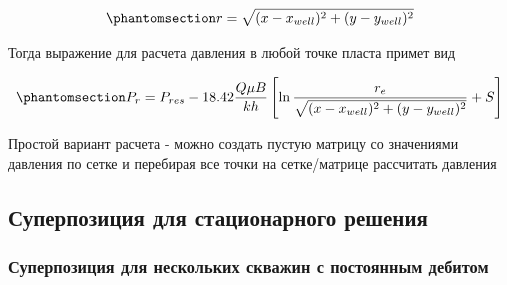 \documentclass[
  russian,
  letterpaper,
  DIV=11,
  numbers=noendperiod,
  oneside]{scrartcl}
\begin{document}
\begin{equation}\phantomsection\label{eq-r_from_x}{
r=\sqrt{ (x-x_{well})^2 + (y-y_{well})^2 }
}\end{equation}

Тогда выражение для расчета давления в любой точке пласта примет вид

\begin{equation}\phantomsection\label{eq-dupui__xy}{
    P_{r} = P_{res} - 18.42\dfrac{ Q\mu B }{kh} \left[ \ln\dfrac{r_e}{\sqrt{ (x-x_{well})^2 + (y-y_{well})^2 }} +S \right]
}\end{equation}

Простой вариант расчета - можно создать пустую матрицу со значениями
давления по сетке и перебирая все точки на сетке/матрице рассчитать
давления

\subsection{Суперпозиция для стационарного
решения}\label{ux441ux443ux43fux435ux440ux43fux43eux437ux438ux446ux438ux44f-ux434ux43bux44f-ux441ux442ux430ux446ux438ux43eux43dux430ux440ux43dux43eux433ux43e-ux440ux435ux448ux435ux43dux438ux44f}

\subsubsection{Суперпозиция для нескольких скважин с постоянным
дебитом}\label{ux441ux443ux43fux435ux440ux43fux43eux437ux438ux446ux438ux44f-ux434ux43bux44f-ux43dux435ux441ux43aux43eux43bux44cux43aux438ux445-ux441ux43aux432ux430ux436ux438ux43d-ux441-ux43fux43eux441ux442ux43eux44fux43dux43dux44bux43c-ux434ux435ux431ux438ux442ux43eux43c}
\end{document}
